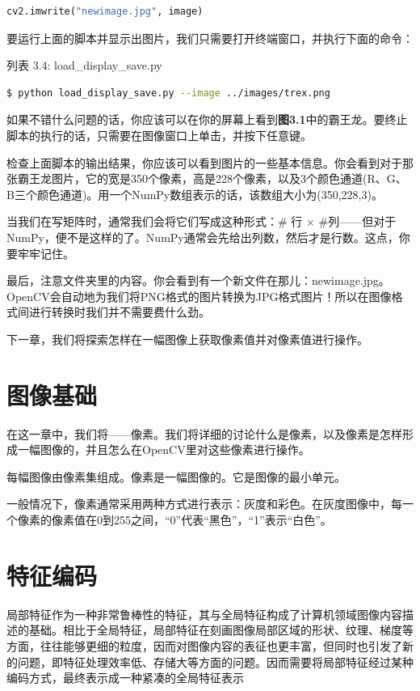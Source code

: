 \documentclass[color=cyan,mathpazo,titlestyle=hang]{elegantbook}
\begin{document}
\begin{lstlisting}[language=python]
cv2.imwrite("newimage.jpg", image)
\end{lstlisting}

要运行上面的脚本并显示出图片，我们只需要打开终端窗口，并执行下面的命令：

列表 3.4: load\_display\_save.py

\begin{lstlisting}[language=bash]
$ python load_display_save.py --image ../images/trex.png
\end{lstlisting}

如果不错什么问题的话，你应该可以在你的屏幕上看到\textbf{图3.1}中的霸王龙。要终止脚本的执行的话，只需要在图像窗口上单击，并按下任意键。

检查上面脚本的输出结果，你应该可以看到图片的一些基本信息。你会看到对于那张霸王龙图片，它的宽是350个像素，高是228个像素，以及3个颜色通道(R、G、B三个颜色通道)。用一个NumPy数组表示的话，该数组大小为(350,228,3)。

当我们在写矩阵时，通常我们会将它们写成这种形式：\# 行 $\times$ \#列——但对于NumPy，便不是这样的了。NumPy通常会先给出列数，然后才是行数。这点，你要牢牢记住。

最后，注意文件夹里的内容。你会看到有一个新文件在那儿：newimage.jpg。OpenCV会自动地为我们将PNG格式的图片转换为JPG格式图片！所以在图像格式间进行转换时我们并不需要费什么劲。

下一章，我们将探索怎样在一幅图像上获取像素值并对像素值进行操作。

\chapter{图像基础}

在这一章中，我们将{\color{red}{审查图像的积木}}——像素。我们将详细的讨论什么是像素，以及像素是怎样形成一幅图像的，并且怎么在OpenCV里对这些像素进行操作。

每幅图像由像素集组成。像素是一幅图像的{\color{red}{原材料，积木}}。它是图像的最小单元。

一般情况下，像素通常采用两种方式进行表示：灰度和彩色。在灰度图像中，每一个像素的像素值在0到255之间，“0”代表“黑色”，“1”表示“白色”。

\chapter{特征编码}

局部特征作为一种非常鲁棒性的特征，其与全局特征构成了计算机领域图像内容描述的基础。相比于全局特征，局部特征在刻画图像局部区域的形状、纹理、梯度等方面，往往能够更细的粒度，因而对图像内容的表征也更丰富，但同时也引发了新的问题，即特征处理效率低、存储大等方面的问题。因而需要将局部特征经过某种编码方式，最终表示成一种紧凑的全局特征表示
\end{document}
